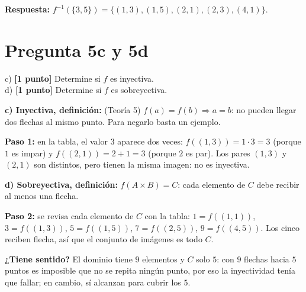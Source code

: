 \documentclass[11pt]{article}
\newcommand{\hl}[1]{\colorbox{green!35}{#1}}
\begin{document}
\textbf{Respuesta:} $f^{-1}(\{3,5\})=\{(1,3),(1,5),(2,1),(2,3),(4,1)\}$.

\clearpage
\section*{Pregunta 5c y 5d}

c) \textbf{[1 punto]} Determine si $f$ es \hl{inyectiva}.\\
d) \textbf{[1 punto]} Determine si $f$ es \hl{sobreyectiva}.

\begin{center}
\end{center}


\begin{explica}
\textbf{c) Inyectiva, definición:} (Teoría 5) $f(a)=f(b)\Rightarrow a=b$: no pueden llegar dos flechas al mismo punto. Para negarlo basta un ejemplo.

\textbf{Paso 1:} en la tabla, el valor $3$ aparece dos veces: $f((1,3))=1\cdot3=3$ (porque $1$ es impar) y $f((2,1))=2+1=3$ (porque $2$ es par). Los pares $(1,3)$ y $(2,1)$ son distintos, pero tienen la misma imagen: no es inyectiva.

\textbf{d) Sobreyectiva, definición:} $f(A\times B)=C$: cada elemento de $C$ debe recibir al menos una flecha.

\textbf{Paso 2:} se revisa cada elemento de $C$ con la tabla: $1=f((1,1))$, $3=f((1,3))$, $5=f((1,5))$, $7=f((2,5))$, $9=f((4,5))$. Los cinco reciben flecha, así que el conjunto de imágenes es todo $C$.

\textbf{¿Tiene sentido?} El dominio tiene $9$ elementos y $C$ solo $5$: con $9$ flechas hacia $5$ puntos es imposible que no se repita ningún punto, por eso la inyectividad tenía que fallar; en cambio, sí alcanzan para cubrir los $5$.
\end{explica}
\end{document}
